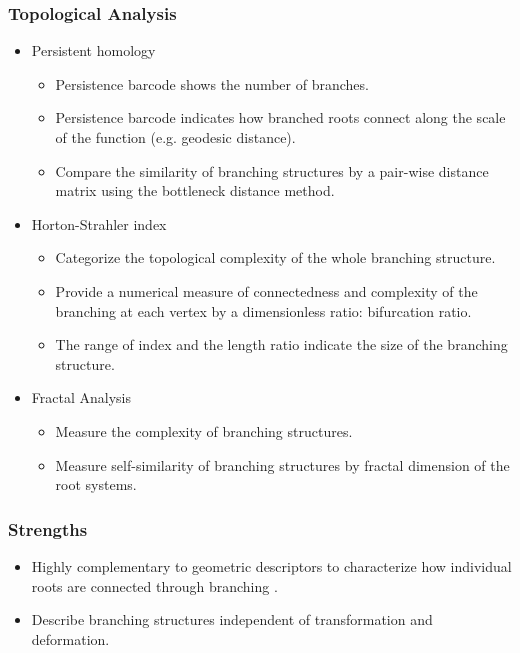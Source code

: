     \subsubsection{Topological Analysis}

      \begin{itemize}
        \item Persistent homology \cite{li2017persistent}
          \begin{itemize}
            \item Persistence barcode shows the number of branches.
            \item Persistence barcode indicates how branched roots connect along the scale of the function (e.g. geodesic distance).
            \item Compare the similarity of branching structures by a pair-wise distance matrix using the bottleneck distance method.
          \end{itemize}
          
       \item Horton-Strahler index \cite{toroczkai2001topological}
         \begin{itemize}
            \item Categorize the topological complexity of the whole branching structure.
            \item Provide a numerical measure of connectedness and complexity of the branching at each vertex by a dimensionless ratio: bifurcation ratio.
            \item The range of index and the length ratio indicate the size of the branching structure.
         \end{itemize}
                
       \item Fractal Analysis \cite{tatsumi1989fractal}
         \begin{itemize}
            \item Measure the complexity of branching structures.
            \item Measure self-similarity of branching structures by fractal dimension of the root systems.
         \end{itemize}
      \end{itemize}
      

   \subsubsection{Strengths}
     \begin{itemize}
       \item Highly complementary to geometric descriptors to characterize how individual roots are connected through branching \cite{delory2018archidart}.
       \item Describe branching structures independent of transformation and deformation.
     \end{itemize}
     

